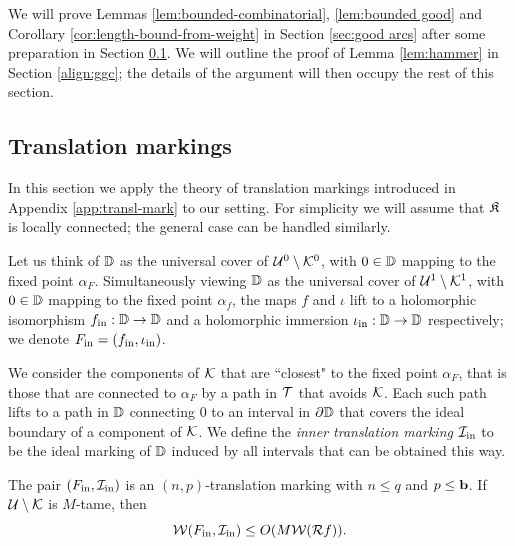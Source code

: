 \documentclass[12pt]{amsart}
\begin{document}
We will prove Lemmas \ref{lem:bounded-combinatorial}, \ref{lem:bounded good}  and Corollary \ref{cor:length-bound-from-weight} in Section \ref{sec:good arcs} after some preparation in Section \ref{sec:translation markings}. We will outline the proof of Lemma \ref{lem:hammer} in Section \ref{align:ggc}; the details of the argument will then occupy the rest of this section.
\subsection{Translation markings} \label{sec:translation markings}
In this section we apply the theory of translation markings introduced in Appendix \ref{app:transl-mark} to our setting. For simplicity we will assume that $\mathfrak{K}$ is locally connected; the general case can be handled similarly.


Let us think of $\mathbb D$ as the universal cover of $\mathcal U^0 \setminus \mathcal K^0$, with $0\in \mathbb D$ mapping to the fixed point $\alpha_F$.
Simultaneously viewing $\mathbb D$ as the universal cover of $\mathcal U^1 \setminus \mathcal K^1$, with $0\in \mathbb D$ mapping to the fixed point $\alpha_f$, the maps $f$ and $\iota$ lift to a holomorphic isomorphism $f_{\mathrm{in}}: \mathbb D\to \mathbb D$ and a holomorphic immersion $\iota_{\mathrm{in}}: \mathbb D\to \mathbb D$ respectively; we denote $F_{\mathrm{in}} = (f_{\mathrm{in}}, \iota_{\mathrm{in}})$. 


We consider the components of $\mathcal K$ that are ``closest" to the fixed point $\alpha_F$, that is those that are connected to $\alpha_F$ by a path in $\mathcal T$ that avoids $\mathcal K$. 
Each such path 
lifts to a path in $\mathbb D$ connecting $0$ to an interval in $\partial \mathbb D$ that covers the ideal boundary of a component of $\mathcal K$.  
We define the \textit{inner translation marking}  $\mathcal I_{\mathrm{in}}$ to be the ideal marking of $\mathbb D$ induced 
by all intervals that can be obtained  this way.
\begin{prop}\label{prop:inner translation marking}
	The pair $(F_{\mathrm{in}}, \mathcal I_{\mathrm{in}})$ is an $(n, p)$-translation marking with $n \leq q$ and $p\leq \mathbf b$. If $\mathcal U\setminus \mathcal K$ is $M$-tame, then   
	$$\mathcal W(F_{\mathrm{in}}, \mathcal I_{\mathrm{in}})\leq O(M\mathcal W(\mathcal R f)).$$
\end{prop}
\end{document}
